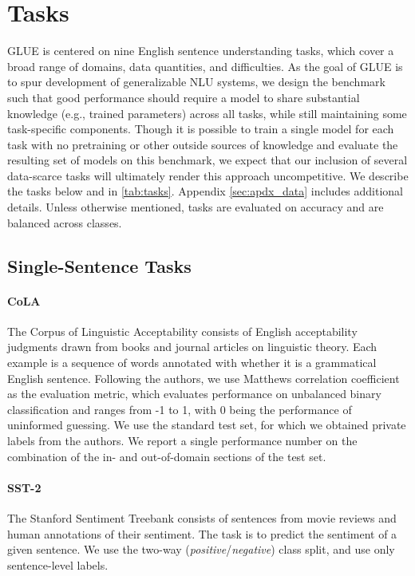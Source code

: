 \documentclass{article} \usepackage{iclr2019_conference,times}
\begin{document}
\section{Tasks}\label{sec:tasks}

GLUE is centered on nine English sentence understanding tasks, which  cover a broad range of domains, data quantities, and difficulties.
As the goal of GLUE is to spur development of generalizable NLU systems, we design the benchmark such that good performance should require a model to share substantial knowledge (e.g., trained parameters) across all tasks, while still maintaining some task-specific components.
Though it is possible to train a single model for each task with no pretraining or other outside sources of knowledge and evaluate the resulting set of models on this benchmark, 
we expect that our inclusion of several data-scarce tasks will ultimately render this approach uncompetitive.
We describe the tasks below and in \autoref{tab:tasks}.  Appendix \ref{sec:apdx_data} includes additional details. Unless otherwise mentioned, tasks are evaluated on accuracy and are balanced across classes.

\subsection{Single-Sentence Tasks}

\paragraph{CoLA}
The Corpus of Linguistic Acceptability \citep{warstadt2018neural}
consists of English acceptability judgments drawn from books and journal articles on linguistic theory.
Each example is a sequence of words annotated with whether it is a grammatical English sentence. 
Following the authors, we use Matthews correlation coefficient \citep{matthews1975comparison} as the evaluation metric, which evaluates performance on unbalanced binary classification and ranges from -1 to 1, with 0 being the performance of uninformed guessing.
We use the standard test set, for which we obtained private labels from the authors.
We report a single performance number on the combination of the in- and out-of-domain sections of the test set.

\paragraph{SST-2}
The Stanford Sentiment Treebank \citep{socher2013recursive} consists of sentences from movie reviews and human annotations of their sentiment. The task is to predict the sentiment of a given sentence. We use the two-way (\textit{positive}/\textit{negative}) class split, and use only sentence-level labels.
\end{document}
